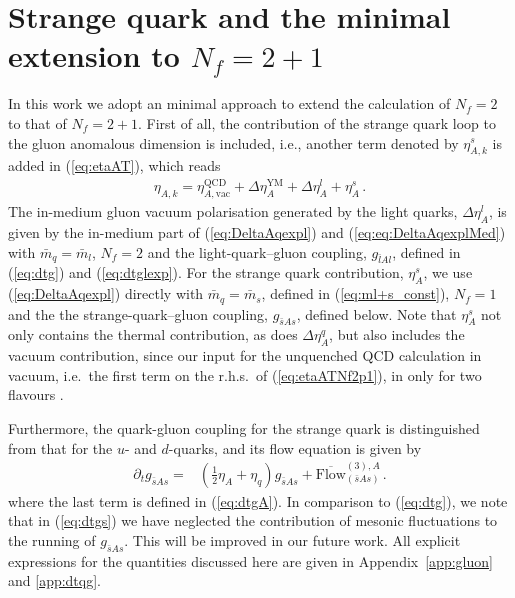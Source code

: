 \documentclass[%
reprint,
superscriptaddress,
showpacs,preprintnumbers,
 amsmath,amssymb,
 aps,
prd,
]{revtex4-1}
\def\eq#1{(\ref{#1})}
\def\app#1{Appendix~\ref{#1}}
\begin{document}

\section{Strange quark and the minimal extension to $N_f=2+1$}
\label{app:Nf2p1}

In this work we adopt an minimal approach to extend the calculation of
$N_f=2$ to that of $N_f=2+1$. First of all, the contribution of the
strange quark loop to the gluon anomalous dimension is included, i.e.,
another term denoted by $\eta_{A,k}^{s}$ is added in \eq{eq:etaAT},
%
which reads
 \begin{align}\label{eq:etaATNf2p1}
   \eta_{A,k}=\eta_{A,\textrm{vac}}^{\text{QCD}} + \Delta\eta_{A}^{\text{YM}}
   +\Delta\eta_{A}^{l} + \eta_{A}^{s}\,.
\end{align}
%
The in-medium gluon vacuum polarisation generated by the light quarks,
$\Delta\eta_{A}^{l}$, is given by the in-medium part of
\eq{eq:DeltaAqexpl} and \eq{eq:eq:DeltaAqexplMed} with
$\bar m_q = \bar m_l$, $N_f = 2$ and the light-quark--gluon coupling,
$g_{\bar l A l}$, defined in \eq{eq:dtg} and \eq{eq:dtglexp}. For the
strange quark contribution, $\eta_{A}^{s}$, we use \eq{eq:DeltaAqexpl}
directly with $\bar m_q = \bar m_s$, defined in \eq{eq:ml+s_const},
$N_f = 1$ and the the strange-quark--gluon coupling, $g_{\bar s A s}$,
defined below. Note that $\eta_{A}^{s}$ not only contains the thermal
contribution, as does $\Delta\eta_{A}^{q}$, but also includes the
vacuum contribution, since our input for the unquenched QCD
calculation in vacuum, i.e.\ the first term on the r.h.s.\ of
\eq{eq:etaATNf2p1}, in only for two flavours \cite{Cyrol:2017ewj}.

Furthermore, the quark-gluon coupling for the strange quark is
distinguished from that for the $u$- and $d$-quarks, and its flow
equation is given by
%
\begin{align}
  \partial_t g_{\bar{s}As}=&\left( \frac12\eta_A+\eta_q\right)
                             g_{\bar{s}As}  +
                             \overline{\textrm{Flow}}^{(3),A}_{(\bar s A s)}\,. 
 \label{eq:dtgs}
\end{align}
%
where the last term is defined in \eq{eq:dtgA}. In comparison to
\eq{eq:dtg}, we note that in \eq{eq:dtgs} we have neglected the
contribution of mesonic fluctuations to the running of
$g_{\bar{s}As}$. This will be improved in our future work. All
explicit expressions for the quantities discussed here are given in
\app{app:gluon} and \ref{app:dtqg}.
\end{document}
